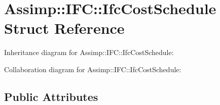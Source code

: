 \hypertarget{struct_assimp_1_1_i_f_c_1_1_ifc_cost_schedule}{\section{Assimp\+:\+:I\+F\+C\+:\+:Ifc\+Cost\+Schedule Struct Reference}
\label{struct_assimp_1_1_i_f_c_1_1_ifc_cost_schedule}
}


Inheritance diagram for Assimp\+:\+:I\+F\+C\+:\+:Ifc\+Cost\+Schedule\+:


Collaboration diagram for Assimp\+:\+:I\+F\+C\+:\+:Ifc\+Cost\+Schedule\+:
\subsection*{Public Attributes}

